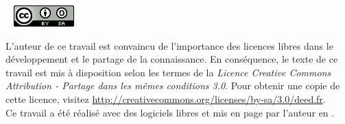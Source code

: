 
~ \vfill
\noindent \includegraphics[]{img/cc-by-sa.png}

\footnotesize
\noindent L'auteur de ce travail est convaincu de l'importance des licences libres dans
le développement et le partage de la connaissance.
En conséquence, le texte de ce travail est mis à disposition selon les termes 
de la \linebreak \emph{Licence Creative Commons Attribution - Partage dans les mêmes 
conditions 3.0}. Pour obtenir une copie de cette licence, visitez  
\url{http://creativecommons.org/licenses/by-sa/3.0/deed.fr}.
\\ 

\noindent Ce travail a été réalisé avec des logiciels libres et mis en page par 
l'auteur en \LaTeXe.
\normalsize
\thispagestyle{empty}
